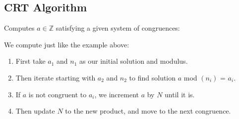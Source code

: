 \newpage
\subsection{CRT Algorithm}
\begin{Func}
Computes \( a\in\mathbb{Z} \) satisfying a given system of congruences:

\begin{algorithm}[H]
    \SetAlgoLined
    \vspace{.5em}
\end{algorithm}
\end{Func}
We compute just like the example above:
\begin{enumerate}
    \item First take $a_1$ and $n_1$ as our initial solution and modulus.
    \item Then iterate starting with $a_2$ and $n_2$ to find solution $a$ mod $(n_i)$ = $a_i$.
    \item If $a$ is not congruent to $a_i$, we increment $a$ by $N$ until it is.
    \item Then update $N$ to the new product, and move to the next congruence.
\end{enumerate}

    